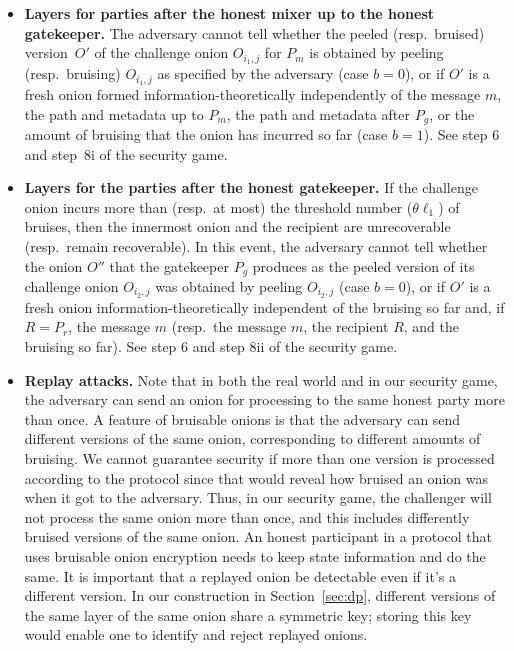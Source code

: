 \documentclass[runningheads,a4paper]{llncs}
\begin{document}
\begin{itemize}
\item \textbf{Layers for parties after the honest mixer up to the honest gatekeeper.} 
The adversary cannot tell whether the peeled (resp.~bruised) version~$O'$ of the challenge onion $O_{i_1, j}$ for $P_m$ is obtained by peeling (resp.~bruising) $O_{i_1, j}$ as specified by the adversary (case $b=0$), or if $O'$ is a fresh onion formed information-theoretically independently of the message $m$, the path and metadata up to $P_m$, the path and metadata after $P_g$, or the amount of bruising that the onion has incurred so far (case $b=1$). See step 6 and step~8i of the security game.  
\item \textbf{Layers for the parties after the honest gatekeeper.} If the challenge onion incurs more than (resp.~at most) the threshold number ($\theta \ell_1$) of bruises, then the innermost onion and the recipient are unrecoverable (resp.~remain recoverable). In this event, the adversary cannot tell whether the onion $O''$ that the gatekeeper $P_g$ produces as the peeled version of its challenge onion $O_{i_2, j}$ was obtained by peeling $O_{i_2, j}$ (case $b=0$), or if $O'$ is a fresh onion information-theoretically independent of the bruising so far and, if $R=P_r$, the message $m$ (resp.~the message $m$, the recipient $R$, and the bruising so far). See step 6 and step 8ii of the security game. 
\item \textbf{Replay attacks.}  Note that in both the real world and in our security game, the adversary can send an onion for processing to the same honest party more than once.  A feature of bruisable onions is that the adversary can send different versions of the same onion, corresponding to different amounts of bruising.  We cannot guarantee security if more than one version is processed according to the protocol since that would reveal how bruised an onion was when it got to the adversary.  Thus, in our security game, the challenger will not process the same onion more than once, and this includes differently bruised versions of the same onion.  An honest participant in a protocol that uses bruisable onion encryption needs to keep state information and do the same.  It is important that a replayed onion be detectable even if it's a different version.  In our construction in Section~\ref{sec:dp}, different versions of the same layer of the same onion share a symmetric key; storing this key would enable one to identify and reject replayed onions. 
\end{itemize}
\end{document}
